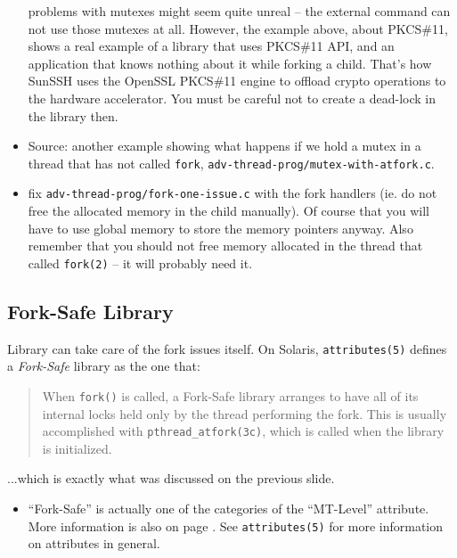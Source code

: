 \begin{itemize}
problems with mutexes might seem quite unreal -- the external command can not
use those mutexes at all. However, the example above, about PKCS\#11, shows a
real example of a library that uses PKCS\#11 API, and an application that knows
nothing about it while forking a child. That's how SunSSH uses the OpenSSL
PKCS\#11 engine to offload crypto operations to the hardware accelerator. You
must be careful not to create a dead-lock in the library then.
\item Source: another example showing what happens if we hold a mutex in a
thread that has not called \texttt{fork},
\texttt{adv-thread-prog/mutex-with-atfork.c}.
\item {} fix \texttt{adv-thread-prog/fork-one-issue.c} with the
fork handlers (ie. do not free the allocated memory in the child manually). Of
course that you will have to use global memory to store the memory pointers
anyway. Also remember that you should not free memory allocated in the thread
that called \texttt{fork(2)} -- it will probably need it.
\end{itemize}

\subsection{Fork-Safe Library}

Library can take care of the fork issues itself. On Solaris,
\texttt{attributes(5)} defines a \emph{Fork-Safe} library as the one that:

\begin{quote}
When \texttt{fork()} is called, a Fork-Safe library  arranges  to have  all  of
its internal locks held only by the thread performing the fork. This is usually
accomplished  with \texttt{pthread\_atfork(3c)},  which is called when the
library is initialized.
\end{quote}

...which is exactly what was discussed on the previous slide.

\begin{itemize}
\item ``Fork-Safe'' is actually one of the categories of the ``MT-Level''
attribute. More information is also on page \pageref{MT_LEVEL}. See
\texttt{at\-tr\-ibu\-tes(5)} for more information on attributes in general.
\end{itemize}

